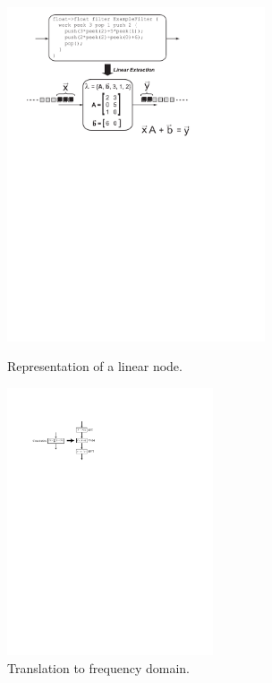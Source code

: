 \documentclass{csailabstractbook}
\begin{document}
\begin{figure}[h]
  \vspace{-0.05in}
  \begin{center}
    \begin{minipage}{3in}
    \includegraphics[width=3in]{thies3-2.pdf} %
    \vspace{-23pt}
    \caption{Representation of a linear node.~~~~~~\protect\label{fig:thies3-node}}
    \end{minipage}
    \hspace{0.1in}
    \begin{minipage}{2.4in}
    \includegraphics[width=2.4in]{thies3-5.pdf} %
    \vspace{-18pt}
    \caption{Translation to frequency domain.\protect\label{fig:thies3-freq}}
    \end{minipage}
  \end{center}
  \vspace{-0.1in}
\end{figure}
\end{document}
